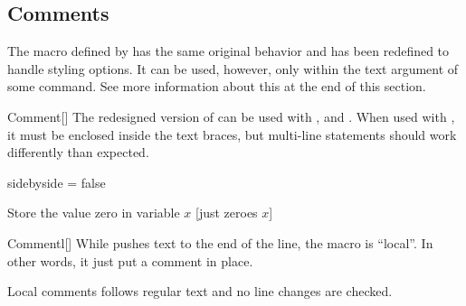 \documentclass[a4paper, 11pt]{article}
\begin{document}
\subsection{Comments}\label{sec:comments}
The  macro defined by  has the same original behavior and has been redefined to handle styling options. It can be used, however, only within the text argument of some command. See more information about this at the end of this section.

\begin{macro}{Comment}[]
    The redesigned version of  can be used with ,  and . When used with , it must be enclosed inside the text braces, but multi-line statements should work differently than expected.

    \StatementOptions
\end{macro}

\begin{tcblisting}{sidebyside = false}
    \begin{minipage}{6.5cm}
        \begin{algorithmic}
            \State Store the value zero in variable $x$
            [just zeroes $x$]%
        \end{algorithmic}
    \end{minipage}
\end{tcblisting}

\begin{macro}{Commentl}[]
    While  pushes text to the end of the line, the macro  is ``local''. In other words, it just put a comment in place.

    Local comments follows regular text and no line changes are checked.
    
    \StatementOptions
\end{macro}

\begin{tcblisting}{}
    \begin{algorithmic}
        \EndIf
    \end{algorithmic}
\end{tcblisting}
\end{document}

